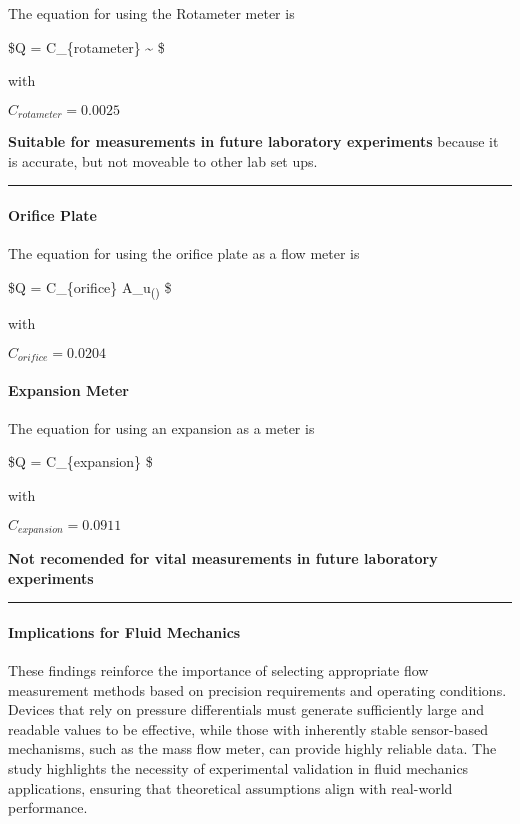 \documentclass[11pt]{article}
\begin{document}
The equation for using the Rotameter meter is

\$Q = C\_\{rotameter\} \textasciitilde{} \$

with

\(C_{rotameter} = 0.0025\)

\textbf{Suitable for measurements in future laboratory experiments}
because it is accurate, but not moveable to other lab set ups.

\begin{center}\rule{0.5\linewidth}{0.5pt}\end{center}

\hypertarget{orifice-plate}{%
\paragraph{Orifice Plate}\label{orifice-plate}}

The equation for using the orifice plate as a flow meter is

\$Q = C\_\{orifice\}
A\_u\textsubscript{()}
\$

with

\(C_{orifice} = 0.0204\)

\hypertarget{expansion-meter}{%
\paragraph{Expansion Meter}\label{expansion-meter}}

The equation for using an expansion as a meter is

\$Q = C\_\{expansion\}
 \$

with

\(C_{expansion} = 0.0911\)

\textbf{Not recomended for vital measurements in future laboratory
experiments}

\begin{center}\rule{0.5\linewidth}{0.5pt}\end{center}

\hypertarget{implications-for-fluid-mechanics}{%
\paragraph{Implications for Fluid
Mechanics}\label{implications-for-fluid-mechanics}}

These findings reinforce the importance of selecting appropriate flow
measurement methods based on precision requirements and operating
conditions. Devices that rely on pressure differentials must generate
sufficiently large and readable values to be effective, while those with
inherently stable sensor-based mechanisms, such as the mass flow meter,
can provide highly reliable data. The study highlights the necessity of
experimental validation in fluid mechanics applications, ensuring that
theoretical assumptions align with real-world performance.
\end{document}
